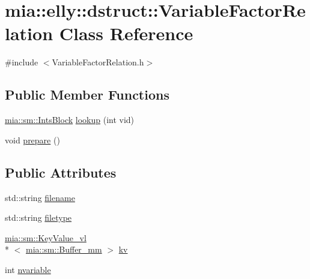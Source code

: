 \hypertarget{classmia_1_1elly_1_1dstruct_1_1_variable_factor_relation}{\section{mia\-:\-:elly\-:\-:dstruct\-:\-:Variable\-Factor\-Relation Class Reference}
\label{classmia_1_1elly_1_1dstruct_1_1_variable_factor_relation}
}


{\ttfamily \#include $<$Variable\-Factor\-Relation.\-h$>$}

\subsection*{Public Member Functions}
\begin{DoxyCompactItemize}
\item 
\hyperlink{classmia_1_1sm_1_1_ints_block}{mia\-::sm\-::\-Ints\-Block} \hyperlink{classmia_1_1elly_1_1dstruct_1_1_variable_factor_relation_a6f3b93d27d11f688cfe9952f057d9a3f}{lookup} (int vid)
\item 
void \hyperlink{classmia_1_1elly_1_1dstruct_1_1_variable_factor_relation_aa264b71ee5c828e06b85cd3588262cf3}{prepare} ()
\end{DoxyCompactItemize}
\subsection*{Public Attributes}
\begin{DoxyCompactItemize}
\item 
std\-::string \hyperlink{classmia_1_1elly_1_1dstruct_1_1_variable_factor_relation_a582e0a5fb2699076d5ec719a32613129}{filename}
\item 
std\-::string \hyperlink{classmia_1_1elly_1_1dstruct_1_1_variable_factor_relation_a14811849a23c099c5d1d9abb718f3d9f}{filetype}
\item 
\hyperlink{classmia_1_1sm_1_1_key_value__vl}{mia\-::sm\-::\-Key\-Value\-\_\-vl}\\*
$<$ \hyperlink{classmia_1_1sm_1_1_buffer__mm}{mia\-::sm\-::\-Buffer\-\_\-mm} $>$ \hyperlink{classmia_1_1elly_1_1dstruct_1_1_variable_factor_relation_a6af37ab4f9c3d0217b7f80664a132a48}{kv}
\item 
int \hyperlink{classmia_1_1elly_1_1dstruct_1_1_variable_factor_relation_ac3f1f9186a88af83b82868b4077ccdc2}{nvariable}
\end{DoxyCompactItemize}


